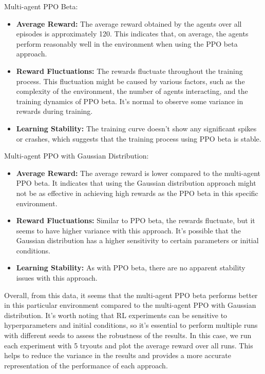 Multi-agent PPO Beta:
\begin{itemize}
    \item \textbf{Average Reward:} The average reward obtained by the agents over all episodes is approximately 120. This indicates that, on average, the agents perform reasonably well in the environment when using the PPO beta approach.
    \item \textbf{Reward Fluctuations:} The rewards fluctuate throughout the training process. This fluctuation might be caused by various factors, such as the complexity of the environment, the number of agents interacting, and the training dynamics of PPO beta. It's normal to observe some variance in rewards during training.
    \item \textbf{Learning Stability:} The training curve doesn't show any significant spikes or crashes, which suggests that the training process using PPO beta is stable.
\end{itemize}
Multi-agent PPO with Gaussian Distribution:
\begin{itemize}
    \item \textbf{Average Reward:} The average reward is lower compared to the multi-agent PPO beta. It indicates that using the Gaussian distribution approach might not be as effective in achieving high rewards as the PPO beta in this specific environment.
    \item \textbf{Reward Fluctuations:} Similar to PPO beta, the rewards fluctuate, but it seems to have higher variance with this approach. It's possible that the Gaussian distribution has a higher sensitivity to certain parameters or initial conditions.
    \item \textbf{Learning Stability:} As with PPO beta, there are no apparent stability issues with this approach.
\end{itemize}
Overall, from this data, it seems that the multi-agent PPO beta performs better in this particular environment compared to the multi-agent PPO with Gaussian distribution.
It's worth noting that RL experiments can be sensitive to hyperparameters and initial conditions, so it's essential to perform multiple runs with different seeds to assess the robustness of the results. In this case, we run each experiment with 5 tryouts and plot the average reward over all runs. This helps to reduce the variance in the results and provides a more accurate representation of the performance of each approach.

